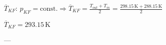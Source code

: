 \( \overline{T}_{KF} \):  
\( p_{KF} = \text{const.} \Rightarrow \overline{T}_{KF} = \frac{T_{out} + T_{in}}{2} = \frac{298.15 \, \text{K} + 288.15 \, \text{K}}{2} \)  

\(\overline{T}_{KF} = 293.15 \, \text{K}\)  

---